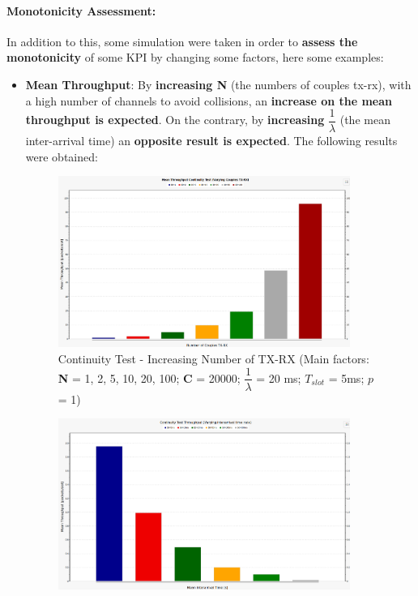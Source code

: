 \paragraph{Monotonicity Assessment:}
\noindent In addition to this, some simulation were taken in order to \textbf{assess the monotonicity} of some KPI by changing some factors, here some examples:
\begin{itemize}
	\item \textbf{Mean Throughput}: By \textbf{increasing N} (the numbers of couples tx-rx), with a high number of channels to avoid collisions, an \textbf{increase on the mean throughput is expected}. On the contrary, by \textbf{increasing} $\dfrac{1}{\lambda}$ (the mean inter-arrival time) an \textbf{opposite result is expected}. The following results were obtained:
	\begin{figure}[H]
		\centering
		\includegraphics[width=0.9\textwidth]{img/continuityTest_Throughput_TXRX_Varying.png}
		\caption{Continuity Test - Increasing Number of TX-RX (Main factors: \textbf{N} = 1, 2, 5, 10, 20, 100; \textbf{C} = 20000; $\dfrac{1}{\lambda}$ = 20 ms; $T_{slot}$ = 5ms; $p$ = 1)}
		\label {img: continuityTestThTXRX}
	\end{figure}
	\begin{figure}[H]
		\centering
		\includegraphics[width=0.9\textwidth]{img/continuityTest_Throughput_IntTimeVarying.png}

\end{figure}
\end{itemize}
